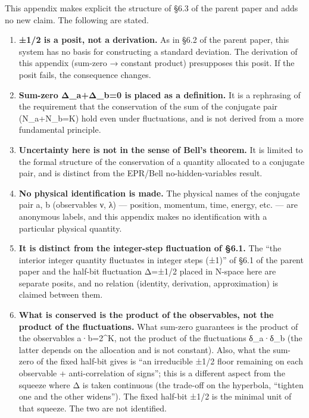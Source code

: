 \documentclass[11pt]{ltjsarticle}
\begin{document}
This appendix makes explicit the structure of §6.3 of the parent paper
and adds no new claim. The following are stated.

\begin{enumerate}
\def\labelenumi{\arabic{enumi}.}
\item
  \textbf{±1/2 is a posit, not a derivation.} As in §6.2 of the parent
  paper, this system has no basis for constructing a standard deviation.
  The derivation of this appendix (sum-zero → constant product)
  presupposes this posit. If the posit fails, the consequence changes.
\item
  \textbf{Sum-zero Δ\_a+Δ\_b=0 is placed as a definition.} It is a
  rephrasing of the requirement that the conservation of the sum of the
  conjugate pair (N\_a+N\_b=K) hold even under fluctuations, and is not
  derived from a more fundamental principle.
\item
  \textbf{Uncertainty here is not in the sense of Bell's theorem.} It is
  limited to the formal structure of the conservation of a quantity
  allocated to a conjugate pair, and is distinct from the EPR/Bell
  no-hidden-variables result.
\item
  \textbf{No physical identification is made.} The physical names of the
  conjugate pair a, b (observables ν, λ) --- position, momentum, time,
  energy, etc. --- are anonymous labels, and this appendix makes no
  identification with a particular physical quantity.
\item
  \textbf{It is distinct from the integer-step fluctuation of §6.1.} The
  ``the interior integer quantity fluctuates in integer steps (±1)'' of
  §6.1 of the parent paper and the half-bit fluctuation Δ=±1/2 placed in
  N-space here are separate posits, and no relation (identity,
  derivation, approximation) is claimed between them.
\item
  \textbf{What is conserved is the product of the observables, not the
  product of the fluctuations.} What sum-zero guarantees is the product
  of the observables a·b=2\^{}K, not the product of the fluctuations
  δ\_a·δ\_b (the latter depends on the allocation and is not constant).
  Also, what the sum-zero of the fixed half-bit gives is ``an
  irreducible ±1/2 floor remaining on each observable + anti-correlation
  of signs''; this is a different aspect from the squeeze where Δ is
  taken continuous (the trade-off on the hyperbola, ``tighten one and
  the other widens''). The fixed half-bit ±1/2 is the minimal unit of
  that squeeze. The two are not identified.
\end{enumerate}
\end{document}
